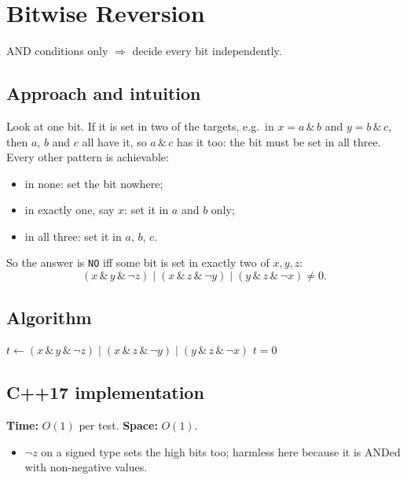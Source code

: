 \section{Bitwise Reversion}
\label{sec:b-reversion}


\begin{patternbox}
AND conditions only $\Rightarrow$ decide every bit independently.
\end{patternbox}

\subsection*{Approach and intuition}

Look at one bit. If it is set in two of the targets, e.g.\ in $x=a\,\&\,b$ and
$y=b\,\&\,c$, then $a$, $b$ and $c$ all have it, so $a\,\&\,c$ has it too:
the bit must be set in all three. Every other pattern is achievable:
\begin{itemize}
  \item in none: set the bit nowhere;
  \item in exactly one, say $x$: set it in $a$ and $b$ only;
  \item in all three: set it in $a$, $b$, $c$.
\end{itemize}
So the answer is \texttt{NO} iff some bit is set in exactly two of $x,y,z$:
\[
  (x\,\&\,y\,\&\,\lnot z)\mid(x\,\&\,z\,\&\,\lnot y)\mid(y\,\&\,z\,\&\,\lnot x)\ne0.
\]

\subsection*{Algorithm}
\begin{algorithmic}[1]
\State $t\gets(x\,\&\,y\,\&\,\lnot z)\mid(x\,\&\,z\,\&\,\lnot y)\mid(y\,\&\,z\,\&\,\lnot x)$
\State \Return $t=0$
\end{algorithmic}


\subsection*{C++17 implementation}

\begin{complexitybox}
\textbf{Time:} $O(1)$ per test. \textbf{Space:} $O(1)$.
\end{complexitybox}

\begin{pitfallbox}
\begin{itemize}
  \item $\lnot z$ on a signed type sets the high bits too; harmless here
        because it is ANDed with non-negative values.
\end{itemize}
\end{pitfallbox}
